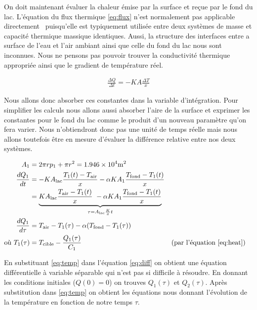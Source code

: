 \documentclass[12pt]{article}
\numberwithin{figure}{section}
\numberwithin{table}{section}
\begin{document}
On doit maintenant \'evaluer la chaleur \'emise par la surface et re\c cue par le fond du lac.
L'\'equation du flux thermique \eqref{eq:flux} n'est normalement pas applicable
directement~\cite{HeatFlow} puisqu'elle est typiquement utilis\'ee entre deux syst\`emes de masse et
capacit\'e thermique massique identiques. Aussi, la structure des interfaces entre a surface de
l'eau et l'air ambiant ainsi que celle du fond du lac nous sont inconnues. Nous ne pensons pas
pouvoir trouver la conductivit\'e thermique appropri\'ee ainsi que le gradient de temp\'erature
r\'eel.

\begin{align}
    \frac{\Delta Q}{\Delta t} = -KA\frac{\Delta T}x \label{eq:flux}
\end{align}

Nous allons donc absorber ces constantes dans la variable d'int\'egration. Pour simplifier les
calculs nous allons aussi absorber l'aire de la surface et exprimer les constantes pour le fond du
lac comme le produit d'un nouveau param\`etre qu'on fera varier. Nous n'obtiendront donc pas une
unit\'e de temps r\'eelle mais nous allons toutefois \^etre en mesure d'\'evaluer la diff\'erence
relative entre nos deux syst\`emes.

\begin{align}
    A_1 &= 2\pi r p_1 + \pi r^2 = \num{1.946e4}\si{\square\meter}\notag\\
    \frac{dQ_1}{dt} &=
        -KA_\text{lac}\frac{T_1(t) - T_\text{air}}x -\alpha KA_1\frac{T_\text{fond}-T_1(t)}x\notag\\
    &= \underbrace{KA_\text{lac}\frac{T_\text{air}-T_1(t)}x\
        -\alpha KA_1\frac{T_\text{fond}-T_1(t)}x}_{\tau = A_\text{lac}\frac Kxt}\notag\\
    \frac{dQ_1}{d\tau} &= T_\text{air} - T_1(\tau) - \alpha (T_\text{fond} -
        T_1(\tau))\label{eq:diff}\\
    \text{o\`u } T_1(\tau) &= T_\text{cible} - \frac{Q_1(\tau)}{C_1} \label{eq:temp}&&\text{(par l'\'equation \eqref{eq:heat})}
\end{align}

En substituant \eqref{eq:temp} dans l'\'equation \eqref{eq:diff} on obtient une \'equation
diff\'erentielle \`a variable s\'eparable qui n'est pas si difficile \`a r\'esoudre. En donnant les
conditions initiales ($Q(0) = 0$) on trouves $Q_1(\tau)$ et $Q_2(\tau)$. Apr\`es substitution dans
\eqref{eq:temp} on obtient les \'equations nous donnant l'\'evolution de la temp\'erature en fonction
de notre temps $\tau$.
\end{document}
